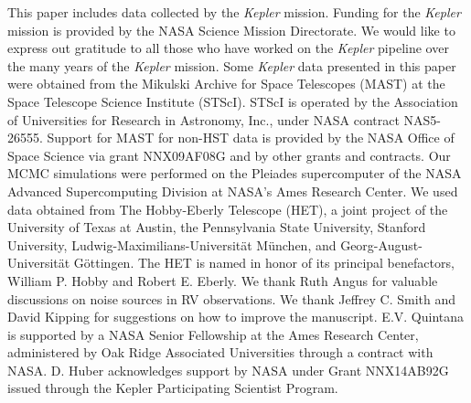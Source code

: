 \documentclass[apjl]{emulateapj}
\begin{document}

\acknowledgments
This paper includes data collected by the \emph{Kepler} mission. Funding for the \emph{Kepler} mission is provided by the NASA Science Mission Directorate. We would like to express out gratitude to all those who have worked on the \emph{Kepler} pipeline over the many years of the \emph{Kepler} mission. Some \emph{Kepler} data presented in this paper were obtained from the Mikulski Archive for Space Telescopes (MAST) at the Space Telescope Science Institute (STScI). STScI is operated by the Association of Universities for Research in Astronomy, Inc., under NASA contract NAS5-26555. Support for MAST for non-HST data is provided by the NASA Office of Space Science via grant NNX09AF08G and by other grants and contracts. Our MCMC simulations were performed on the Pleiades supercomputer of the NASA Advanced Supercomputing Division at NASA's Ames Research Center. We used data obtained from The Hobby-Eberly Telescope (HET), a joint project of the University of Texas at Austin, the Pennsylvania State University, Stanford University, Ludwig-Maximilians-Universit\"{a}t M\"{u}nchen, and Georg-August-Universit\"{a}t G\"{o}ttingen. The HET is named in honor of its principal benefactors, William P. Hobby and Robert E. Eberly. We thank Ruth Angus for valuable discussions on noise sources in RV observations. We thank Jeffrey C. Smith and David Kipping for suggestions on how to improve the manuscript. E.V. Quintana is supported by a NASA Senior Fellowship at the Ames Research Center, administered by Oak Ridge Associated Universities through a contract with NASA. D. Huber acknowledges support by NASA under Grant NNX14AB92G issued through the Kepler Participating Scientist Program.






\end{document}

